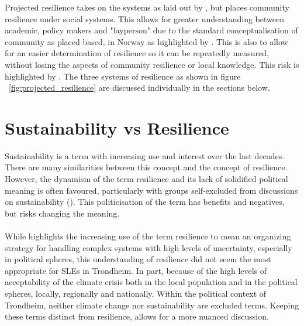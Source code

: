 Projected resilience takes on the systems as laid out by \cite{cutter_community_2020}, but places community resilience under social systems. This allows for greater understanding between academic, policy makers and "layperson" due to the standard conceptualisation of community as placed based, in Norway as highlighted by \cite{rasanen_conceptualizing_2020}. This is also to allow for an easier determination of resilience so it can be repeatedly measured, without losing the aspects of community resilience or local knowledge. This risk is highlighted by \cite{rasanen_conceptualizing_2020}. The three systems of resilience as shown in figure ~\ref{fig:projected_resilience} are discussed individually in the sections below.



\section{Sustainability vs Resilience}

Sustainability is a term with increasing use and interest over the last decades. There are many similarities between this concept and the concept of resilience. However, the dynamism of the term resilience and its lack of solidified political meaning is often favoured, particularly with groups self-excluded from discussions on sustainability (\cite{moser_turbulent_2019}). This politicisation of the term has benefits and negatives, but risks changing the meaning.
\paragraph{}

While \cite{moser_turbulent_2019} highlights the increasing use of the term resilience to mean an organizing strategy for handling complex systems with high levels of uncertainty, especially in political spheres, this understanding of resilience did not seem the most appropriate for SLEs in Trondheim. In part, because of the high levels of acceptability of the climate crisis both in the local population and in the political spheres, locally, regionally and nationally. Within the political context of Trondheim, neither climate change nor sustainability are excluded terms. Keeping these terms distinct from resilience, allows for a more nuanced discussion.







